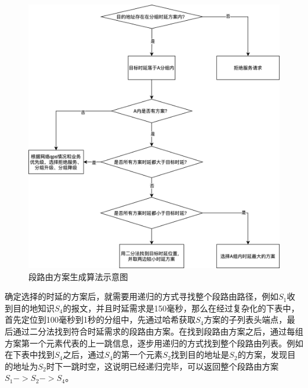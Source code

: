 \begin{figure}[htbp]
\setlength{\abovecaptionskip}{15pt plus 3pt minus 2pt}
\centerline{\includegraphics[width=1\textwidth]{./figures/ch4-find-sr-ans.png}}
\caption{段路由方案生成算法示意图}
\label{fig-ch4-find-sr-ans}
\end{figure}
    
确定选择的时延的方案后，就需要用递归的方式寻找整个段路由路径，例如$S_1$收到目的地知识$S_4$的报文，并且时延需求是150毫秒，那么在经过复杂化的下表中，首先定位到100毫秒到1秒的分组中，先通过哈希获取$S_4$方案的子列表头端点，最后通过二分法找到符合时延需求的段路由方案。在找到段路由方案之后，通过每组方案第一个元素代表的上一跳信息，逐步用递归的方式找到整个段路由列表。例如在下表中找到$S_4$之后，通过$S_4$的第一个元素$S_2$找到目的地址是$S_2$的方案，发现目的地址为$S_2$时下一跳时空，这说明已经递归完毕，可以返回整个段路由方案$S_1->S_2->S_4$。

\begin{table}[htbp]
\center
{}
\end{table}

